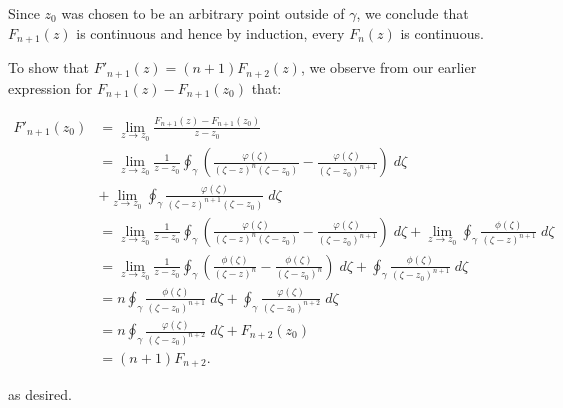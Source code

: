 \begin{solution}
    Since $z_0$ was chosen to be an arbitrary point outside of $\gamma$, we conclude that $F_{n+1}(z)$ is continuous and
    hence by induction, every $F_n(z)$ is continuous.
    
    
    To
    show that $F'_{n+1}(z) = (n + 1) F_{n+2}(z)$, we observe from our earlier expression for 
    $F_{n+1}(z) - F_{n+1}(z_0)$ that:

    \begin{align*}
        F'_{n+1}(z_0) &= \lim_{z \to z_0} \frac{F_{n+1}(z) - F_{n+1}(z_0)}{z - z_0} \\
                    &= \lim_{z \to z_0} \frac{1}{z - z_0}\oint_{\gamma} {\left(\frac{\varphi(\zeta)}{(\zeta - z)^{n}(\zeta - z_0)} - \frac{\varphi(\zeta)}{(\zeta - z_0)^{n+1}} \right) \; d\zeta} \\
                    &+ \lim_{z \to z_0} \oint_{\gamma} {\frac{\varphi(\zeta)}{(\zeta - z)^{n+1}(\zeta - z_0)} \; d\zeta} \\
                    &= \lim_{z \to z_0} \frac{1}{z - z_0}\oint_{\gamma} {\left(\frac{\varphi(\zeta)}{(\zeta - z)^{n}(\zeta - z_0)} - \frac{\varphi(\zeta)}{(\zeta - z_0)^{n+1}} \right) \; d\zeta}
                    + \lim_{z \to z_0} \oint_{\gamma} {\frac{\phi(\zeta)}{(\zeta - z)^{n+1}} \; d\zeta} \\
                    &= \lim_{z \to z_0} \frac{1}{z - z_0}\oint_{\gamma} {\left(\frac{\phi(\zeta)}{(\zeta - z)^{n}} - \frac{\phi(\zeta)}{(\zeta - z_0)^n} \right) \; d\zeta}
                    + \oint_{\gamma} {\frac{\phi(\zeta)}{(\zeta - z_0)^{n+1}} \; d\zeta} \\
                    &= n \oint_{\gamma} {\frac{\phi(\zeta)}{(\zeta - z_0)^{n+1}} \; d\zeta}
                    + \oint_{\gamma} {\frac{\varphi(\zeta)}{(\zeta - z_0)^{n+2}} \; d\zeta} \\
                    &= n \oint_{\gamma} {\frac{\varphi(\zeta)}{(\zeta - z_0)^{n+2}} \; d\zeta} + F_{n+2}(z_0) \\
                    &= (n + 1) F_{n+2}.
    \end{align*}

    as desired.
\end{solution}